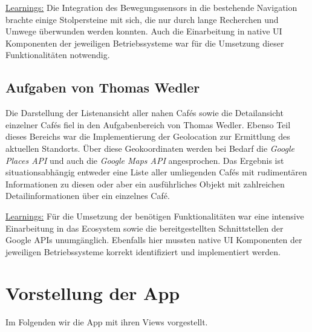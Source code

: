 \underline{Learnings:}
Die Integration des Bewegungssensors in die bestehende Navigation brachte einige Stolpersteine mit sich, die nur durch lange Recherchen und Umwege überwunden werden konnten.
Auch die Einarbeitung in native UI Komponenten der jeweiligen Betriebssysteme war für die Umsetzung dieser Funktionalitäten notwendig.

\subsection{Aufgaben von Thomas Wedler}
Die Darstellung der Listenansicht aller nahen Cafés sowie die Detailansicht einzelner Cafés fiel in den Aufgabenbereich von Thomas Wedler.
Ebenso Teil dieses Bereichs war die Implementierung der Geolocation zur Ermittlung des aktuellen Standorts.
Über diese Geokoordinaten werden bei Bedarf die \emph{Google Places API} und auch die \emph{Google Maps API} angesprochen.
Das Ergebnis ist situationsabhängig entweder eine Liste aller umliegenden Cafés mit rudimentären Informationen zu diesen oder aber ein ausführliches Objekt mit zahlreichen Detailinformationen über ein einzelnes Café.

\underline{Learnings:}
Für die Umsetzung der benötigen Funktionalitäten war eine intensive Einarbeitung in das Ecosystem sowie die bereitgestellten Schnittstellen der Google APIs unumgänglich.
Ebenfalls hier mussten native UI Komponenten der jeweiligen Betriebssysteme korrekt identifiziert und implementiert werden.

\newpage

\section{Vorstellung der App}
Im Folgenden wir die App mit ihren Views vorgestellt.
\nopagebreak

